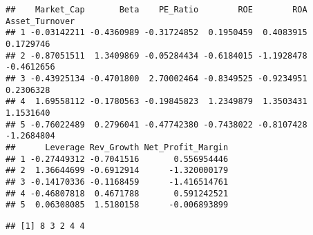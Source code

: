 \documentclass[
]{article}
\newenvironment{Shaded}{\begin{snugshade}}{\end{snugshade}}
\newcommand{\AttributeTok}[1]{\textcolor[rgb]{0.13,0.29,0.53}{#1}}
\newcommand{\CommentTok}[1]{\textcolor[rgb]{0.56,0.35,0.01}{\textit{#1}}}
\newcommand{\DecValTok}[1]{\textcolor[rgb]{0.00,0.00,0.81}{#1}}
\newcommand{\FloatTok}[1]{\textcolor[rgb]{0.00,0.00,0.81}{#1}}
\newcommand{\FunctionTok}[1]{\textcolor[rgb]{0.13,0.29,0.53}{\textbf{#1}}}
\newcommand{\NormalTok}[1]{#1}
\newcommand{\OtherTok}[1]{\textcolor[rgb]{0.56,0.35,0.01}{#1}}
\newcommand{\SpecialCharTok}[1]{\textcolor[rgb]{0.81,0.36,0.00}{\textbf{#1}}}
\begin{document}
\begin{Shaded}
\end{Shaded}

\begin{verbatim}
##    Market_Cap       Beta    PE_Ratio        ROE        ROA Asset_Turnover
## 1 -0.03142211 -0.4360989 -0.31724852  0.1950459  0.4083915      0.1729746
## 2 -0.87051511  1.3409869 -0.05284434 -0.6184015 -1.1928478     -0.4612656
## 3 -0.43925134 -0.4701800  2.70002464 -0.8349525 -0.9234951      0.2306328
## 4  1.69558112 -0.1780563 -0.19845823  1.2349879  1.3503431      1.1531640
## 5 -0.76022489  0.2796041 -0.47742380 -0.7438022 -0.8107428     -1.2684804
##      Leverage Rev_Growth Net_Profit_Margin
## 1 -0.27449312 -0.7041516       0.556954446
## 2  1.36644699 -0.6912914      -1.320000179
## 3 -0.14170336 -0.1168459      -1.416514761
## 4 -0.46807818  0.4671788       0.591242521
## 5  0.06308085  1.5180158      -0.006893899
\end{verbatim}

\begin{Shaded}
\end{Shaded}

\begin{verbatim}
## [1] 8 3 2 4 4
\end{verbatim}

\begin{Shaded}
\end{Shaded}
\end{document}
